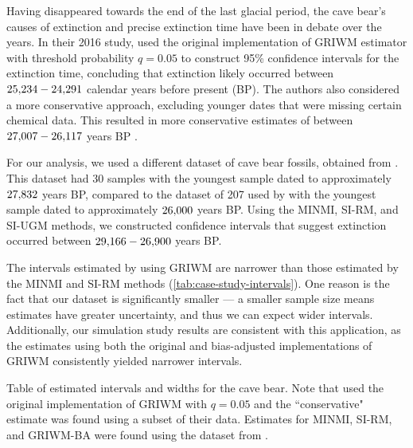 Having disappeared towards the end of the last glacial period, the cave bear's causes of extinction and precise extinction time have been in debate over the years. In their 2016 study, \citet{Baca2016} used the original implementation of GRIWM estimator with threshold probability $q = 0.05$ to construct 95\% confidence intervals for the extinction time, concluding that extinction likely occurred between $25{\small,}234 - 24{\small,}291$ calendar years before present (BP). The authors also considered a more conservative approach, excluding younger dates that were missing certain chemical data. This resulted in more conservative estimates of between $27{\small,}007 - 26{\small,}117$ years BP \cite{Baca2016}.

For our analysis, we used a different dataset of cave bear fossils, obtained from \citet{Cooper2015}. This dataset had 30 samples with the youngest sample dated to approximately $27{\small,}832$ years BP, compared to the dataset of 207 used by \citet{Baca2016} with the youngest sample dated to approximately $26{\small,}000$ years BP. Using the MINMI, SI-RM, and SI-UGM methods, we constructed confidence intervals that suggest extinction occurred between $29{\small,}166 - 26{\small,}900$ years BP.

The intervals estimated by \citet{Baca2016} using GRIWM are narrower than those estimated by the MINMI and SI-RM methods (\autoref{tab:case-study-intervals}). One reason is the fact that our dataset is significantly smaller --- a smaller sample size means estimates have greater uncertainty, and thus we can expect wider intervals. Additionally, our simulation study results are consistent with this application, as the estimates using both the original and bias-adjusted implementations of GRIWM consistently yielded narrower intervals.
\begin{table}[ht]
    \centering
    \caption{Table of estimated intervals and widths for the cave bear. Note that \citet{Baca2016} used the original implementation of GRIWM with $q=0.05$ and the ``conservative" estimate was found using a subset of their data. Estimates for MINMI, SI-RM, and GRIWM-BA were found using the dataset from \citet{Cooper2015}.}
    
    \label{tab:case-study-intervals}
    \vspace{-4mm}
\end{table}

